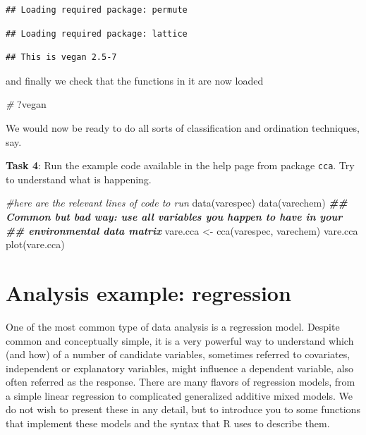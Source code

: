 \documentclass[
]{article}
\newenvironment{Shaded}{\begin{snugshade}}{\end{snugshade}}
\newcommand{\CommentTok}[1]{\textcolor[rgb]{0.56,0.35,0.01}{\textit{#1}}}
\newcommand{\DocumentationTok}[1]{\textcolor[rgb]{0.56,0.35,0.01}{\textbf{\textit{#1}}}}
\newcommand{\FunctionTok}[1]{\textcolor[rgb]{0.00,0.00,0.00}{#1}}
\newcommand{\NormalTok}[1]{#1}
\newcommand{\OtherTok}[1]{\textcolor[rgb]{0.56,0.35,0.01}{#1}}
\begin{document}
\begin{verbatim}
## Loading required package: permute
\end{verbatim}

\begin{verbatim}
## Loading required package: lattice
\end{verbatim}

\begin{verbatim}
## This is vegan 2.5-7
\end{verbatim}

and finally we check that the functions in it are now loaded

\begin{Shaded}
\begin{Highlighting}[]
\CommentTok{\#}
\NormalTok{?vegan}
\end{Highlighting}
\end{Shaded}

We would now be ready to do all sorts of classification and ordination
techniques, say.

\textbf{Task 4}: Run the example code available in the help page from
package \texttt{cca}. Try to understand what is happening.

\begin{Shaded}
\begin{Highlighting}[]
\CommentTok{\#here are the relevant lines of code to run}
\FunctionTok{data}\NormalTok{(varespec)}
\FunctionTok{data}\NormalTok{(varechem)}
\DocumentationTok{\#\# Common but bad way: use all variables you happen to have in your}
\DocumentationTok{\#\# environmental data matrix}
\NormalTok{vare.cca }\OtherTok{\textless{}{-}} \FunctionTok{cca}\NormalTok{(varespec, varechem)}
\NormalTok{vare.cca}
\FunctionTok{plot}\NormalTok{(vare.cca)}
\end{Highlighting}
\end{Shaded}

\hypertarget{analysis-example-regression}{%
\section{Analysis example:
regression}\label{analysis-example-regression}}

One of the most common type of data analysis is a regression model.
Despite common and conceptually simple, it is a very powerful way to
understand which (and how) of a number of candidate variables, sometimes
referred to covariates, independent or explanatory variables, might
influence a dependent variable, also often referred as the response.
There are many flavors of regression models, from a simple linear
regression to complicated generalized additive mixed models. We do not
wish to present these in any detail, but to introduce you to some
functions that implement these models and the syntax that R uses to
describe them.
\end{document}
